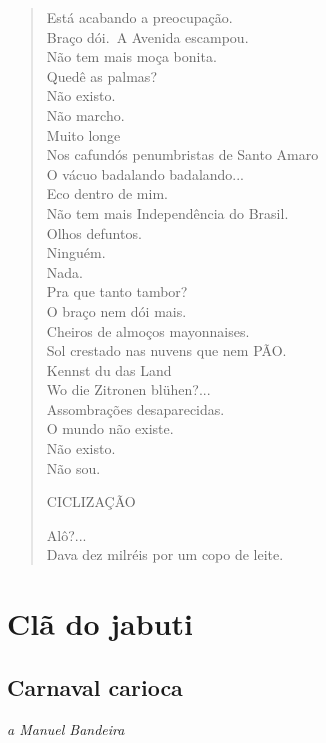 \begin{verse}
Está acabando a preocupação.\\
Braço dói.\
A Avenida escampou.\\
Não tem mais moça bonita.\\
Quedê as palmas?\\
Não existo.\\
Não marcho.\\
Muito longe\\
Nos cafundós penumbristas de Santo Amaro\\
O vácuo badalando badalando...\\
Eco dentro de mim.\\
Não tem mais Independência do Brasil.\\
Olhos defuntos.\\
Ninguém.\\
Nada.\\
Pra que tanto tambor?\\
O braço nem dói mais.\\
Cheiros de almoços mayonnaises.\\
Sol crestado nas nuvens que nem PÃO.\\
Kennst du das Land\\
Wo die Zitronen blühen?...\\
Assombrações desaparecidas.\\
O mundo não existe.\\
Não existo.\\
Não sou.

CICLIZAÇÃO

Alô?...\\
Dava dez milréis por um copo de leite.
\end{verse}

\part{Clã do jabuti}

\chapter[Carnaval carioca]{Carnaval carioca }

\hfill\emph{a Manuel Bandeira}

